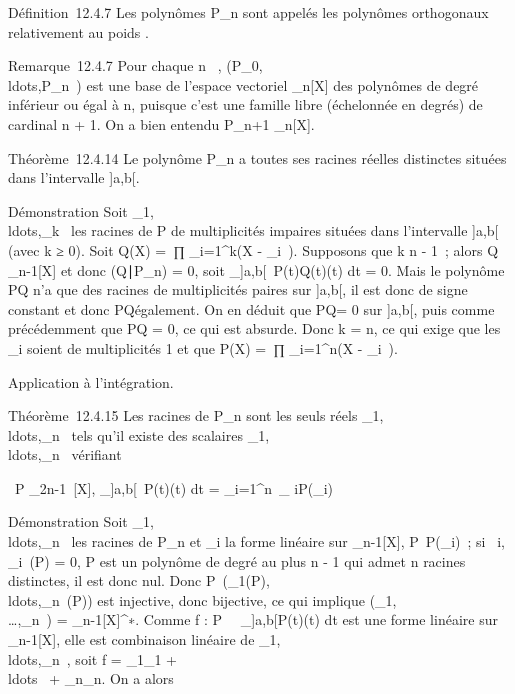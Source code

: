 \documentclass[]{article}
\begin{document}
Définition~12.4.7 Les polynômes P_n sont appelés les polynômes
orthogonaux relativement au poids \omega.

Remarque~12.4.7 Pour chaque n \in {}~,
(P_0,\\ldots,P_n~)
est une base de l'espace vectoriel _n[X] des polynômes de
degré inférieur ou égal à n, puisque c'est une famille libre (échelonnée
en degrés) de cardinal n + 1. On a bien entendu P_n+1 \bot
{}_n[X].

Théorème~12.4.14 Le polynôme P_n a toutes ses racines réelles
distinctes situées dans l'intervalle ]a,b[.

Démonstration Soit
\alpha_1,\\ldots,\alpha_k~
les racines de P de multiplicités impaires situées dans l'intervalle
]a,b[ (avec k ≥ 0). Soit Q(X) =\
∏  _i=1^k(X - \alpha_i~).
Supposons que k \leq n - 1~; alors Q \in {}_n-1[X] et donc
(Q∣P_n) = 0, soit
\int  _]a,b[~P(t)Q(t)\omega(t) dt = 0.
Mais le polynôme PQ n'a que des racines de multiplicités paires sur
]a,b[, il est donc de signe constant et donc PQ\omega également. On en
déduit que PQ\omega = 0 sur ]a,b[, puis comme précédemment que PQ = 0, ce
qui est absurde. Donc k = n, ce qui exige que les \alpha_i soient de
multiplicités 1 et que P(X) =\
∏  _i=1^n(X - \alpha_i~).

Application à l'intégration.

Théorème~12.4.15 Les racines de P_n sont les seuls réels
\alpha_1,\\ldots,\alpha_n~
tels qu'il existe des scalaires
\lambda_1,\\ldots,\lambda_n~
vérifiant

\forall~P \in {}_2n-1~[X],
\int  _]a,b[~P(t)\omega(t) dt =
\sum _i=1^n\lambda~_
iP(\alpha_i)

Démonstration Soit
\alpha_1,\\ldots,\alpha_n~
les racines de P_n et \epsilon_i la forme linéaire sur
\mathbb{R}_n-1[X], P\mapsto~P(\alpha_i)~; si
\forall~i, \epsilon_i~(P) = 0, P est un polynôme de
degré au plus n - 1 qui admet n racines distinctes, il est donc nul.
Donc
P\mapsto~(\epsilon_1(P),\\ldots,\epsilon_n~(P))
est injective, donc bijective, ce qui implique
\mathrmVect(\epsilon_1,\\\ldots,\epsilon_n~)
= _n-1[X]^∗. Comme f :
P\mapsto~\int ~
_]a,b[P(t)\omega(t) dt est une forme linéaire sur
\mathbb{R}_n-1[X], elle est combinaison linéaire de
\epsilon_1,\\ldots,\epsilon_n~,
soit f = \lambda_1\epsilon_1 +
\\ldots~ +
\lambda_n\epsilon_n. On a alors
\end{document}

